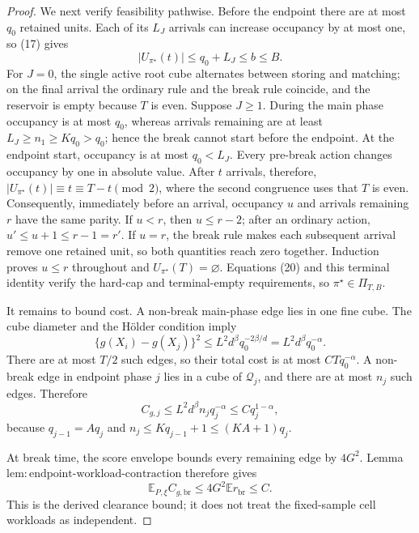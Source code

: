 \documentclass{article}
\begin{document}
\begin{proof}
We next verify feasibility pathwise.  Before the endpoint there are at most \(q_0\) retained units.  Each of its \(L_J\) arrivals can increase occupancy by at most one, so (17) gives
\[
 |U_{\pi^\star}(t)|\le q_0+L_J\le b\le B. \tag{20}
\]
For \(J=0\), the single active root cube alternates between storing and matching; on the final arrival the ordinary rule and the break rule coincide, and the reservoir is empty because \(T\) is even.  Suppose \(J\ge1\).  During the main phase occupancy is at most \(q_0\), whereas arrivals remaining are at least \(L_J\ge n_1\ge Kq_0>q_0\); hence the break cannot start before the endpoint.  At the endpoint start, occupancy is at most \(q_0<L_J\).  Every pre-break action changes occupancy by one in absolute value.  After \(t\) arrivals, therefore, \(|U_{\pi^\star}(t)|\equiv t\equiv T-t\pmod 2\), where the second congruence uses that \(T\) is even.  Consequently, immediately before an arrival, occupancy \(u\) and arrivals remaining \(r\) have the same parity.  If \(u<r\), then \(u\le r-2\); after an ordinary action, \(u'\le u+1\le r-1=r'\).  If \(u=r\), the break rule makes each subsequent arrival remove one retained unit, so both quantities reach zero together.  Induction proves \(u\le r\) throughout and \(U_{\pi^\star}(T)=\varnothing\).  Equations (20) and this terminal identity verify the hard-cap and terminal-empty requirements, so \(\pi^\star\in\Pi_{T,B}\).

It remains to bound cost.  A non-break main-phase edge lies in one fine cube.  The cube diameter and the H\"older condition imply
\[
 \{g(X_i)-g(X_j)\}^2
 \le L^2d^\beta q_0^{-2\beta/d}
 =L^2d^\beta q_0^{-\alpha}. \tag{21}
\]
There are at most \(T/2\) such edges, so their total cost is at most \(C Tq_0^{-\alpha}\).  A non-break edge in endpoint phase \(j\) lies in a cube of \(\mathcal Q_j\), and there are at most \(n_j\) such edges.  Therefore
\[
 C_{g,j}\le L^2d^\beta n_jq_j^{-\alpha}
 \le Cq_j^{1-\alpha}, \tag{22}
\]
because \(q_{j-1}=Aq_j\) and \(n_j\le Kq_{j-1}+1\le(KA+1)q_j\).

At break time, the score envelope bounds every remaining edge by \(4G^2\).  Lemma \(\mathrm{lem:endpoint\text{-}workload\text{-}contraction}\) therefore gives
\[
 \mathbb E_{P,\xi} C_{g,\mathrm{br}}
 \le4G^2\mathbb E r_{\mathrm{br}}\le C. \tag{23}
\]
This is the derived clearance bound; it does not treat the fixed-sample cell workloads as independent.


\end{proof}
\end{document}
